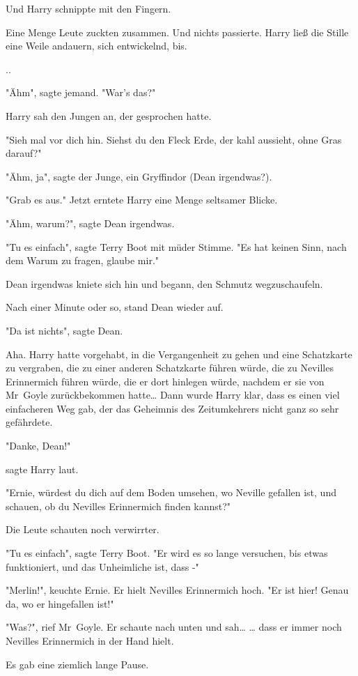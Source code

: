 {Und Harry schnippte mit den Fingern.

Eine Menge Leute zuckten zusammen. Und nichts passierte. Harry ließ die Stille eine Weile andauern, sich entwickelnd, bis.

..

"Ähm", sagte jemand. "War's das?"

Harry sah den Jungen an, der gesprochen hatte.

"Sieh mal vor dich hin. Siehst du den Fleck Erde, der kahl aussieht, ohne Gras darauf?"

"Ähm, ja", sagte der Junge, ein Gryffindor (Dean irgendwas?).

"Grab es aus." Jetzt erntete Harry eine Menge seltsamer Blicke.

"Ähm, warum?", sagte Dean irgendwas.

"Tu es einfach", sagte Terry Boot mit müder Stimme. "Es hat keinen Sinn, nach dem Warum zu fragen, glaube mir."

Dean irgendwas kniete sich hin und begann, den Schmutz wegzuschaufeln.

Nach einer Minute oder so, stand Dean wieder auf.

"Da ist nichts", sagte Dean.

Aha. Harry hatte vorgehabt, in die Vergangenheit zu gehen und eine Schatzkarte zu vergraben, die zu einer anderen Schatzkarte führen würde, die zu Nevilles Erinnermich führen würde, die er dort hinlegen würde, nachdem er sie von Mr~Goyle zurückbekommen hatte… Dann wurde Harry klar, dass es einen viel einfacheren Weg gab, der das Geheimnis des Zeitumkehrers nicht ganz so sehr gefährdete.

"Danke, Dean!"

sagte Harry laut.

"Ernie, würdest du dich auf dem Boden umsehen, wo Neville gefallen ist, und schauen, ob du Nevilles Erinnermich finden kannst?"

Die Leute schauten noch verwirrter.

"Tu es einfach", sagte Terry Boot. "Er wird es so lange versuchen, bis etwas funktioniert, und das Unheimliche ist, dass -"

"Merlin!", keuchte Ernie. Er hielt Nevilles Erinnermich hoch. "Er ist hier! Genau da, wo er hingefallen ist!"

"Was?", rief Mr~Goyle. Er schaute nach unten und sah… … dass er immer noch Nevilles Erinnermich in der Hand hielt.

Es gab eine ziemlich lange Pause.

}
